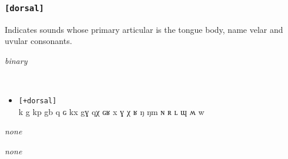 \documentclass[10pt,letterpaper]{article}
\begin{document}
\subsubsection{\texttt{[dorsal]}}
\label{ssub:feature_dorsal}
\begin{samepage}
\begin{description}
\itemsep1pt \parskip0pt  
\item[Descritpion] Indicates sounds whose primary articular is the tongue body, name velar and uvular consonants.
\item[Type] \emph{binary}
\item[Examples]\
  \begin{itemize}
    \item \texttt{[+dorsal]}\\
    k g kp gb q ɢ kx gɣ qχ ɢʁ x ɣ χ ʁ ŋ ŋm ɴ ʀ ʟ ɰ ʍ w 
  \end{itemize}
\item[Constraints] \emph{none}
\item[Resctrictions] \emph{none}
\end{description}
\end{samepage}
\end{document}
